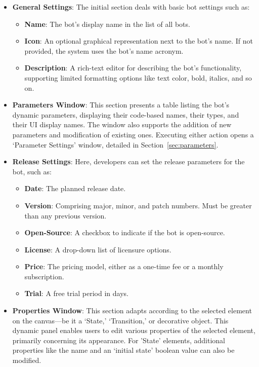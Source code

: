 \begin{itemize}
  \item \textbf{General Settings}: The initial section deals with basic bot settings such as:
  \begin{itemize}
    \item \textbf{Name}: The bot's display name in the list of all bots.
    \item \textbf{Icon}: An optional graphical representation next to the bot's name. If not provided, the system uses the bot's name acronym.
    \item \textbf{Description}: A rich-text editor for describing the bot's functionality, supporting limited formatting options like text color, bold, italics, and so on.
  \end{itemize}

  \item \textbf{Parameters Window}: This section presents a table listing the bot's dynamic parameters, displaying their code-based names, their types, and their UI display names. The window also supports the addition of new parameters and modification of existing ones. Executing either action opens a `Parameter Settings' window, detailed in Section~\ref{sec:parameters}.
  
  \item \textbf{Release Settings}: Here, developers can set the release parameters for the bot, such as:
  \begin{itemize}
    \item \textbf{Date}: The planned release date.
    \item \textbf{Version}: Comprising major, minor, and patch numbers. Must be greater than any previous version.
    \item \textbf{Open-Source}: A checkbox to indicate if the bot is open-source.
    \item \textbf{License}: A drop-down list of licensure options.
    \item \textbf{Price}: The pricing model, either as a one-time fee or a monthly subscription.
    \item \textbf{Trial}: A free trial period in days.
  \end{itemize}

  \item \textbf{Properties Window}: This section adapts according to the selected element on the canvas—be it a `State,' `Transition,' or decorative object. This dynamic panel enables users to edit various properties of the selected element, primarily concerning its appearance. For 'State' elements, additional properties like the name and an `initial state' boolean value can also be modified.
\end{itemize}

